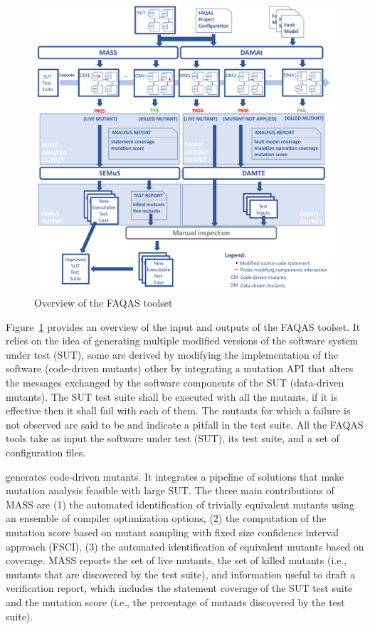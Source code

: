 \begin{figure}[tb]
\begin{center}
\includegraphics[width=\textwidth]{images/FAQAS-overview.pdf}
\caption{Overview of the FAQAS toolset}
\label{fig:FAQAS:toolset}
\end{center}
\end{figure}

Figure~\ref{fig:FAQAS:toolset} provides an overview of the input and outputs of the FAQAS toolset. It relies on the idea of generating multiple modified versions of the software system under test (SUT), some are derived by modifying the implementation of the software (code-driven mutants) other by integrating a mutation API that alters the messages exchanged by the software components of the SUT (data-driven mutants). 
The SUT test suite shall be executed with all the mutants, if it is effective then it shall fail with each of them. The mutants for which a failure is not observed are said to be  and indicate a pitfall in the test suite.
All the FAQAS tools take as input the software under test (SUT), its test suite, and a set of configuration files. 

 generates code-driven mutants. It integrates a pipeline of solutions that make mutation analysis feasible with large SUT. The three main contributions of MASS are (1) the automated identification of trivially equivalent mutants using an ensemble of compiler optimization options, (2) the computation of the mutation score based on mutant sampling with fixed size confidence interval approach (FSCI), (3) the automated identification of equivalent mutants based on coverage. 
MASS reports the set of live mutants, the set of killed mutants (i.e., mutants that are discovered by the test suite), and information useful to draft a verification report, which includes the statement coverage of the SUT test suite and the mutation score (i.e., the percentage of mutants discovered by the test suite).

